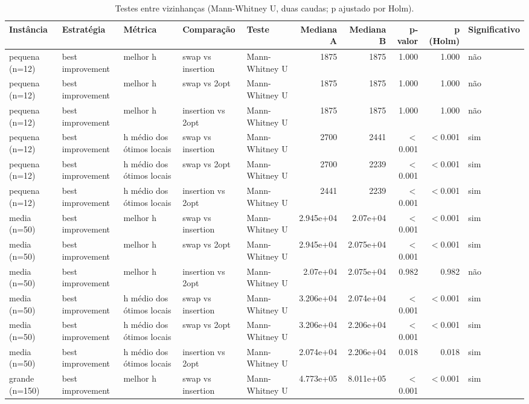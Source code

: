 \begin{table}[ht]
\centering
\small
\caption{Testes entre vizinhanças (Mann-Whitney U, duas caudas; p ajustado por Holm).}
\label{tab:testes_qualidade}
\begin{tabular}{lllllrrrrl}
\hline
Instância & Estratégia & Métrica & Comparação & Teste & Mediana A & Mediana B & p-valor & p (Holm) & Significativo \\
\hline
pequena (n=12) & best improvement & melhor h & swap vs insertion & Mann-Whitney U & 1875 & 1875 & 1.000 & 1.000 & não \\
pequena (n=12) & best improvement & melhor h & swap vs 2opt & Mann-Whitney U & 1875 & 1875 & 1.000 & 1.000 & não \\
pequena (n=12) & best improvement & melhor h & insertion vs 2opt & Mann-Whitney U & 1875 & 1875 & 1.000 & 1.000 & não \\
pequena (n=12) & best improvement & h médio dos ótimos locais & swap vs insertion & Mann-Whitney U & 2700 & 2441 & $<$0.001 & $<$0.001 & sim \\
pequena (n=12) & best improvement & h médio dos ótimos locais & swap vs 2opt & Mann-Whitney U & 2700 & 2239 & $<$0.001 & $<$0.001 & sim \\
pequena (n=12) & best improvement & h médio dos ótimos locais & insertion vs 2opt & Mann-Whitney U & 2441 & 2239 & $<$0.001 & $<$0.001 & sim \\
\hline
media (n=50) & best improvement & melhor h & swap vs insertion & Mann-Whitney U & 2.945e+04 & 2.07e+04 & $<$0.001 & $<$0.001 & sim \\
media (n=50) & best improvement & melhor h & swap vs 2opt & Mann-Whitney U & 2.945e+04 & 2.075e+04 & $<$0.001 & $<$0.001 & sim \\
media (n=50) & best improvement & melhor h & insertion vs 2opt & Mann-Whitney U & 2.07e+04 & 2.075e+04 & 0.982 & 0.982 & não \\
media (n=50) & best improvement & h médio dos ótimos locais & swap vs insertion & Mann-Whitney U & 3.206e+04 & 2.074e+04 & $<$0.001 & $<$0.001 & sim \\
media (n=50) & best improvement & h médio dos ótimos locais & swap vs 2opt & Mann-Whitney U & 3.206e+04 & 2.206e+04 & $<$0.001 & $<$0.001 & sim \\
media (n=50) & best improvement & h médio dos ótimos locais & insertion vs 2opt & Mann-Whitney U & 2.074e+04 & 2.206e+04 & 0.018 & 0.018 & sim \\
\hline
grande (n=150) & best improvement & melhor h & swap vs insertion & Mann-Whitney U & 4.773e+05 & 8.011e+05 & $<$0.001 & $<$0.001 & sim \\

\end{tabular}
\end{table}
